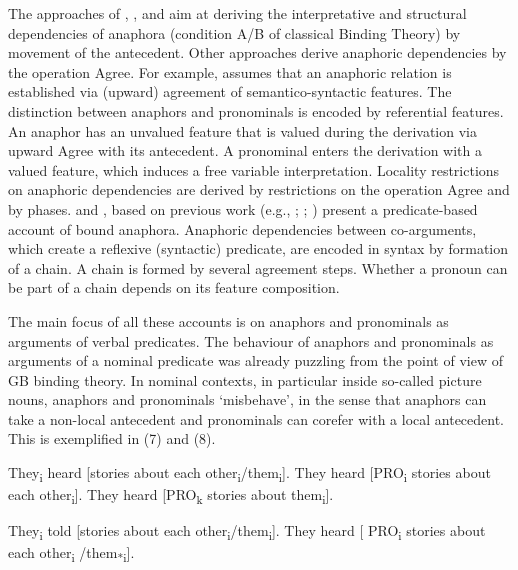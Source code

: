 \documentclass[output=paper]{langsci/langscibook}
\begin{document}
The approaches of \citet{Hornstein2001,Hornstein2007}, \citet{Boeckx2010}, \citet{Zwart2002} and \citet{Kayne2002} aim at deriving the interpretative and structural dependencies of anaphora (condition A\slash B of classical Binding Theory) by movement of the antecedent. Other approaches derive anaphoric dependencies by the operation Agree. For example, \citet{Hicks2009} assumes that an anaphoric relation is established via (upward) agreement of semantico-syntactic features. The distinction between anaphors and pronominals is encoded by referential features. An anaphor has an unvalued feature that is valued during the derivation via upward Agree with its antecedent. A pronominal enters the derivation with a valued feature, which induces a free variable interpretation. Locality restrictions on anaphoric dependencies are derived by restrictions on the operation Agree and by phases. \citet{Reinhart2006} and \citet{Reuland2011}, based on previous work (e.g., \citealt{Reinhart1983}; \citealt{Reinhart1993,Reinhart1995}; \citealt{Reuland2001}) present a predicate-based account of bound anaphora. Anaphoric dependencies between co-arguments, which create a reflexive (syntactic) predicate, are encoded in syntax by formation of a chain. A chain is formed by several agreement steps. Whether a pronoun can be part of a chain depends on its feature composition.

The main focus of all these accounts is on anaphors and pronominals as arguments of verbal predicates. The behaviour of anaphors and pronominals as arguments of a nominal predicate was already puzzling from the point of view of GB binding theory. In nominal contexts, in particular inside so-called picture nouns, anaphors and pronominals ‘misbehave’, in the sense that anaphors can take a non-local antecedent and pronominals can corefer with a local antecedent. This is exemplified in (7) and (8). 

\ea%
    \citep[166–167]{Chomsky1986Knowledge}\label{ex:wein:7}
\ea  They\textsubscript{i} heard [stories about each other\textsubscript{i}\slash them\textsubscript{i}].
\ex  They heard [PRO\textsubscript{i} stories about each other\textsubscript{i}].
\ex  They heard [PRO\textsubscript{k} stories about them\textsubscript{i}].
    \z
\z

\ea%
    \label{ex:wein:8}
    \ea They\textsubscript{i} told [stories about each other\textsubscript{i}\slash *them\textsubscript{i}].
    \ex They heard [ PRO\textsubscript{i} stories about each other\textsubscript{i} /them\textsubscript{*i}].
    \z
\z
\end{document}
